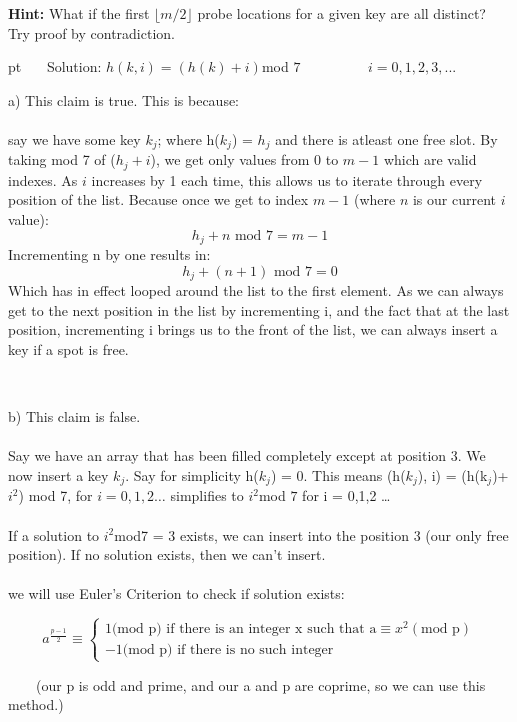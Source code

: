 \documentclass{assignment-263}
\begin{document}
\begin{enumerate}
\begin{enumerate}
				\textbf{Hint:} What if the first $\lfloor m/2\rfloor$ probe
				locations for a given key are all distinct? Try proof by
				contradiction.
		\end{enumerate}
 pt
\ \ \ Solution:
$h(k,i) = (h(k)+i)$mod $7$  \ \ \ \ \ \ \ \ \ $i = 0,1,2,3,...$

a) This claim is true. This is because:\\\\
say we have some key $k_j$; where h($k_j$) = $h_j$ and there is atleast one free slot. By taking mod 7 of ($h_j + i$), we get only values from 0 to $m- 1$ which are valid indexes. As $i$ increases by 1 each time, this allows us to iterate through every position of the list. Because once we get to index $m-1$ (where $n$ is our current $i$ value):
$$ h_j + n \text{ mod } 7 = m - 1$$
Incrementing n by one results in:
$$ h_j + (n + 1) \text{ mod } 7 = 0$$
Which has in effect looped around the list to the first element. As we can always get to the next position in the list by incrementing i, and the fact that at the last position, incrementing i brings us to the front of the list, we can always insert a key if a spot is free.

\ \ \ \ 

b) This claim is false.\\\\
Say we have an array that has been filled completely except at  position 3. We now insert a key $k_j$. Say for simplicity h($k_j$) = 0. This means (h($k_j$), i) = (h(k$_j$)+$i^2$) mod 7, for $ i = 0, 1, 2 \dots$ simplifies to $i^2$mod $7$ for i = 0,1,2 \dots \\\\
If a solution to $i^2$mod7 = 3 exists, we can insert into the position 3 (our only free position). If no solution exists, then we can't insert.\\\\
 we will use Euler's Criterion to check if solution exists:




 

    \[ a^{\frac{p-1}{2}} \equiv \begin{cases} 
         1\text{(mod p) \ \ \ \ if there is an integer x such that a} \equiv x^2  (\text{mod p}) \\
         -1\text{(mod p) \ \ \ \ if there is no such integer} 
       \end{cases}
    \]


\ \ \ \ (our p is odd and prime, and our a and p are coprime, so we can use this method.)



\end{enumerate}
\end{document}
